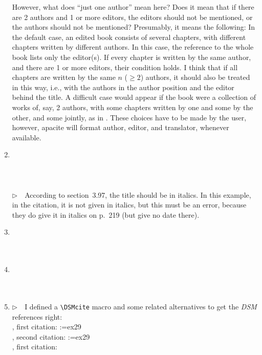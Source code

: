 \documentclass{article}
\makeatletter
\newcommand{\DSMciteA}[1]{%
  \@for\@citec:=#1\do{%
    \@ifundefined{flag@\@citec\@extra@b@citeb}%
      {\citeA{\@citec}}%
      {\citeauthor{\@citec}}%
  }%
}
\newcommand{\DSMfullciteA}[1]{%
  \fullciteA{#1}%
}
\newcommand{\DSMcite}[1]{%
  {\BBOP}%
  \@for\@citec:=#1\do{%
    \@ifundefined{flag@\@citec\@extra@b@citeb}%
      {\citeNP{\@citec}}%
      {\citeauthor{\@citec}}%
  }%
  {\BBCP}%
}
\newcommand{\EM}{\ensuremath{\triangleright\quad}}
\newcommand{\pkg}[1]{\textsf{#1}}%
\newcommand{\cmd}[1]{\texttt{\string#1}}%
\makeatother
\begin{document}
\begin{enumerate}
      However, what does ``just one author'' mean here? Does it mean that if
      there are 2 authors and 1 or more editors, the editors should
      not be mentioned, or the authors should not be mentioned?
      Presumably, it means the following:
      In the default case, an edited book consists of several chapters,
      with different chapters written by different authors. In this case,
      the reference to the whole book lists only the editor(s).
      If every chapter is written by the same author, and there are 1
      or more editors, their condition holds. I think that if all
      chapters are written by the same $n$ ($\geq 2$) authors, it should
      also be treated in this way, i.e., with the authors in the
      author position and the editor behind the title. A difficult
      case would appear if the book were a collection of works of, say,
      2 authors, with some chapters written by one and some by the
      other, and some jointly, as in . These choices have
      to be made by the user, however, \pkg{apacite} will format author,
      editor, and translator, whenever available.
\item \cite{ex26} \\ \cite{ex26}\\ \\ \\
      \EM According to section~3.97, the title should be in italics.
      In this example, in the citation, it is not given in italics,
      but this must be an error, because they do give it in italics
      on p.~219 (but give no date there).
\item \cite{ex27} \\ \cite{ex27}\\ \\ 
\item \cite{ex28} \\ \cite{ex28}\\ \\ 
\item \EM I defined a \verb+\DSMcite+ macro and some related
      alternatives to get the \emph{DSM} references right:\\
      \cmd{\DSMcite}, first citation: \DSMcite{ex29} \\
      \cmd{\DSMcite}, second citation: \DSMcite{ex29} \\
      \cmd{\DSMciteA}, first citation: \DSMfullciteA{ex29} \\

\end{enumerate}
\end{document}
